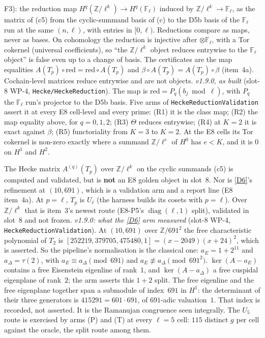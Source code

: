 \documentclass[11pt]{article}
\theoremstyle{remark}
\newcommand{\F}{\mathbb{F}}
\newcommand{\Z}{\mathbb{Z}}
\newcommand{\Fl}{\F_\ell}
\begin{document}
\begin{itemize}
  F3): the reduction map $H^q(\Z/\ell^k)\to H^q(\Fl)$ induced by $\Z/\ell^k\to\Fl$, as the matrix
  of (c5) from the cyclic-summand basis of (c) to the D5b basis of the $\Fl$ run at the same
  $(n,\ell)$, with entries in $[0,\ell)$. Reductions compare as maps, never as bases. On
  cohomology the reduction is injective after $\otimes\Fl$, with a Tor cokernel (universal
  coefficients), so ``the $\Z/\ell^k$ object reduces entrywise to the $\Fl$ object'' is false even
  up to a change of basis. The certificates are the map equalities
  $A(T_p)\circ\mathrm{red}=\mathrm{red}\circ A(T_p)$ and $\beta\circ A(T_p)=A(T_p)\circ\beta$
  (item~4a). Cochain-level matrices reduce entrywise and are not objects. \emph{v1.9.0, as built}
  (slot-8 WP-4, \texttt{Hecke/HeckeReduction}). The map is
  $\mathrm{red}=P_q(b_j\bmod\ell)$, with $P_q$ the $\Fl$ run's projector to the D5b basis. Five
  arms of \texttt{HeckeReductionValidation} assert it at every E8 cell-level and every prime:
  (R1) it is the class map; (R2) the map equality above, for $q=0,1,2$; (R3) $\Theta$ reduces
  entrywise; (R4) at $K=2$ it is exact against $\beta$; (R5) functoriality from $K=3$ to $K=2$.
  At the E8 cells its Tor cokernel is non-zero exactly where a summand $\Z/\ell^e$ of $H^0$ has
  $e<K$, and it is $0$ on $H^1$ and $H^2$.
\end{itemize}
The Hecke matrix $A^{(q)}(T_p)$ over $\Z/\ell^k$ on the cyclic summands (c5) is computed and
validated, but is \textbf{not} an E8 golden object in slot~8. Nor is \ref{D6}'s refinement at
$(10,691)$, which is a validation arm and a report line (E8 item~4a). At $p=\ell$, $T_p$ is
$U_\ell$ (the harness builds its cosets with $p=\ell$). Over $\Z/\ell^k$ that is item~3's newest
route (E8-P5's $\operatorname{diag}(\ell,1)$ split), validated in slot~8 and not frozen.
\emph{v1.9.0: what the \ref{D6} arm measured} (slot-8 WP-4, \texttt{HeckeReductionValidation}).
At $(10,691)$ over $\Z/691^2$ the free characteristic polynomial of $T_2$ is
$[252219,379705,475480,1]=(x-2049)(x+24)^2$, which is asserted. So the pipeline's normalisation is
the classical one: $a_E=1+2^{11}$ and $a_\Delta=\tau(2)$, with $a_E\equiv a_\Delta\pmod{691}$ and
$a_E\not\equiv a_\Delta\pmod{691^2}$. $\ker(A-a_E)$ contains a free Eisenstein eigenline of
rank~$1$, and $\ker(A-a_\Delta)$ a free cuspidal eigenplane of rank~$2$; the arm asserts this
$1+2$ split. The free eigenline and the free eigenplane together span a submodule of index~$691$
in $H^1$: the determinant of their three generators is $415291=601\cdot691$, of $691$-adic
valuation~$1$. That index is recorded, not asserted. It is the Ramanujan congruence seen
integrally. The $U_5$ route is exercised by arms (P) and (T) at
every $\ell=5$ cell: $115$ distinct $g$ per cell against the oracle, the split route among them.
\end{document}
